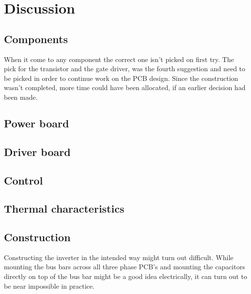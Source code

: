 \section{Discussion}
\label{sec:discussion}
 


\subsection{Components}
When it come to any component the correct one isn't picked on first try. The pick for the transistor and the gate driver, was the fourth suggestion and need to be picked in order to continue work on the PCB design. Since the construction wasn't completed, more time could have been allocated, if an earlier decision had been made. 

\subsection{Power board}

\subsection{Driver board}

\subsection{Control}

\subsection{Thermal characteristics}


\subsection{Construction}
Constructing the inverter in the intended way might turn out difficult. While mounting the bus bars across all three phase PCB's and mounting the capacitors directly on top of the bus bar might be a good idea electrically, it can turn out to be near impossible in practice.


